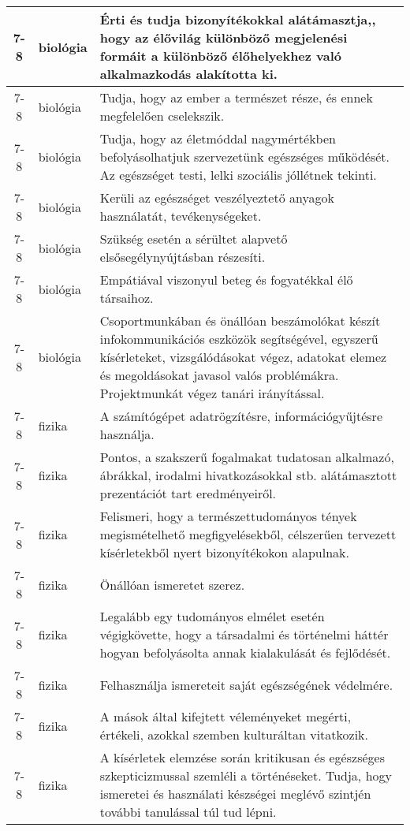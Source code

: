 \begin{small}
\begin{longtable}{c | p{2cm} |  p{11cm} }
              7-8 & biológia & Érti és tudja bizonyítékokkal alátámasztja,, hogy az élővilág különböző megjelenési formáit a különböző élőhelyekhez való alkalmazkodás alakította ki. \\ \hline
              7-8 & biológia & Tudja, hogy az ember a természet része, és ennek megfelelően cselekszik. \\ \hline
              7-8 & biológia & Tudja, hogy az életmóddal nagymértékben befolyásolhatjuk szervezetünk egészséges működését. Az egészséget testi, lelki szociális jóllétnek tekinti. \\ \hline
              7-8 & biológia & Kerüli az egészséget veszélyeztető anyagok használatát, tevékenységeket. \\ \hline
              7-8 & biológia & Szükség esetén a sérültet alapvető elsősegélynyújtásban részesíti. \\ \hline
              7-8 & biológia & Empátiával viszonyul beteg és fogyatékkal élő társaihoz. \\ \hline
              7-8 & biológia & Csoportmunkában és önállóan beszámolókat készít infokommunikációs eszközök segítségével, egyszerű kísérleteket, vizsgálódásokat végez, adatokat elemez és megoldásokat javasol valós problémákra. Projektmunkát végez tanári irányítással. \\ \hline
              7-8 & fizika & A számítógépet adatrögzítésre, információgyűjtésre használja. \\ \hline
              7-8 & fizika & Pontos, a szakszerű fogalmakat tudatosan alkalmazó, ábrákkal, irodalmi hivatkozásokkal stb. alátámasztott prezentációt tart eredményeiről. \\ \hline
              7-8 & fizika & Felismeri, hogy a természettudományos tények megismételhető megfigyelésekből, célszerűen tervezett kísérletekből nyert bizonyítékokon alapulnak. \\ \hline
              7-8 & fizika & Önállóan ismeretet szerez. \\ \hline
              7-8 & fizika & Legalább egy tudományos elmélet esetén végigkövette, hogy a társadalmi és történelmi háttér hogyan befolyásolta annak kialakulását és fejlődését. \\ \hline
              7-8 & fizika & Felhasználja ismereteit saját egészségének védelmére. \\ \hline
              7-8 & fizika & A mások által kifejtett véleményeket megérti, értékeli, azokkal szemben kulturáltan vitatkozik. \\ \hline
              7-8 & fizika & A kísérletek elemzése során kritikusan és egészséges szkepticizmussal szemléli a történéseket. Tudja, hogy ismeretei és használati készségei meglévő szintjén további tanulással túl tud lépni. \\ \hline

\end{longtable}
\end{small}
